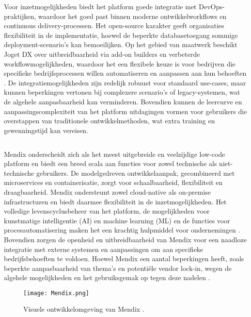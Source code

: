 Voor inzetmogelijkheden biedt het platform goede integratie met DevOps-praktijken, waardoor het goed past binnen moderne ontwikkelworkflows en continuous delivery-processen. Het open-source karakter geeft organisaties flexibiliteit in de implementatie, hoewel de beperkte databasetoegang sommige deployment-scenario's kan bemoeilijken. Op het gebied van maatwerk beschikt Joget DX over uitbreidbaarheid via add-on builders en verbeterde workflowmogelijkheden, waardoor het een flexibele keuze is voor bedrijven die specifieke bedrijfsprocessen willen automatiseren en aanpassen aan hun behoeften \autocite{Sido2024}. De integratiemogelijkheden zijn redelijk robuust voor standaard use-cases, maar kunnen beperkingen vertonen bij complexere scenario's of legacy-systemen, wat de algehele aanpasbaarheid kan verminderen. Bovendien kunnen de leercurve en aanpassingscomplexiteit van het platform uitdagingen vormen voor gebruikers die overstappen van traditionele ontwikkelmethoden, wat extra training en gewenningstijd kan vereisen.
\subsection{}
Mendix onderscheidt zich als het meest uitgebreide en veelzijdige low-code platform en biedt een breed scala aan functies voor zowel technische als niet-technische gebruikers. De modelgedreven ontwikkelaanpak, gecombineerd met microservices en containerisatie, zorgt voor schaalbaarheid, flexibiliteit en draagbaarheid. Mendix ondersteunt zowel cloud-native als on-premise infrastructuren en biedt daarmee flexibiliteit in de inzetmogelijkheden. Het volledige levenscyclusbeheer van het platform, de mogelijkheden voor kunstmatige intelligentie (AI) en machine learning (ML) en de functies voor procesautomatisering maken het een krachtig hulpmiddel voor ondernemingen \autocite{Sido2024}. Bovendien zorgen de openheid en uitbreidbaarheid van Mendix voor een naadloze integratie met externe systemen en aanpassingen om aan specifieke bedrijfsbehoeften te voldoen. Hoewel Mendix een aantal beperkingen heeft, zoals beperkte aanpasbaarheid van thema's en potentiële vendor lock-in, wegen de algehele mogelijkheden en het gebruiksgemak op tegen deze nadelen \autocite{Sido2024}.

\begin{figure}[H]
    \centering
    \texttt{[image: Mendix.png]}
    \caption[Visuele ontwikkelomgeving Mendix]{\label{fig:Mendix} Visuele ontwikkelomgeving van Mendix \autocite{Mendix2025}.}
\end{figure}


